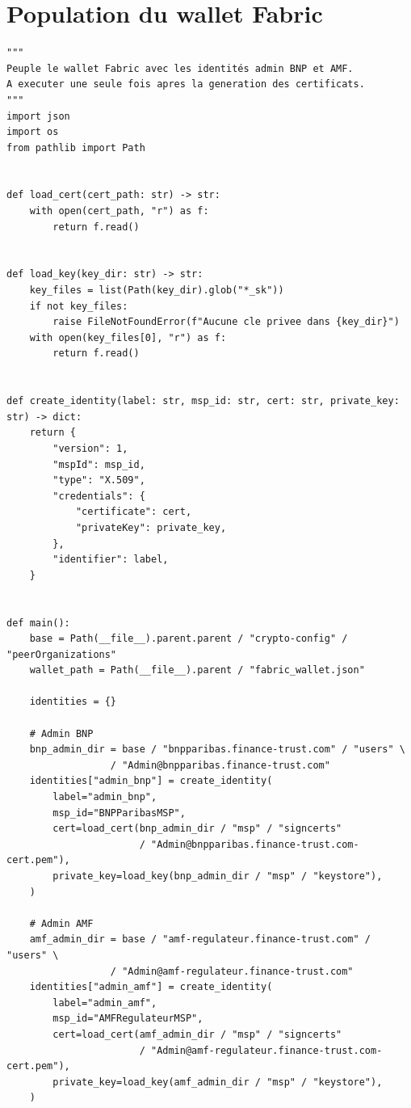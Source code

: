 \documentclass[12pt,a4paper,french]{article}
\begin{document}
\section{Population du wallet Fabric}

\begin{lstlisting}[style=python, caption={network/wallets/populate\_wallet.py}]
"""
Peuple le wallet Fabric avec les identités admin BNP et AMF.
A executer une seule fois apres la generation des certificats.
"""
import json
import os
from pathlib import Path


def load_cert(cert_path: str) -> str:
    with open(cert_path, "r") as f:
        return f.read()


def load_key(key_dir: str) -> str:
    key_files = list(Path(key_dir).glob("*_sk"))
    if not key_files:
        raise FileNotFoundError(f"Aucune cle privee dans {key_dir}")
    with open(key_files[0], "r") as f:
        return f.read()


def create_identity(label: str, msp_id: str, cert: str, private_key: str) -> dict:
    return {
        "version": 1,
        "mspId": msp_id,
        "type": "X.509",
        "credentials": {
            "certificate": cert,
            "privateKey": private_key,
        },
        "identifier": label,
    }


def main():
    base = Path(__file__).parent.parent / "crypto-config" / "peerOrganizations"
    wallet_path = Path(__file__).parent / "fabric_wallet.json"

    identities = {}

    # Admin BNP
    bnp_admin_dir = base / "bnpparibas.finance-trust.com" / "users" \
                  / "Admin@bnpparibas.finance-trust.com"
    identities["admin_bnp"] = create_identity(
        label="admin_bnp",
        msp_id="BNPParibasMSP",
        cert=load_cert(bnp_admin_dir / "msp" / "signcerts"
                       / "Admin@bnpparibas.finance-trust.com-cert.pem"),
        private_key=load_key(bnp_admin_dir / "msp" / "keystore"),
    )

    # Admin AMF
    amf_admin_dir = base / "amf-regulateur.finance-trust.com" / "users" \
                  / "Admin@amf-regulateur.finance-trust.com"
    identities["admin_amf"] = create_identity(
        label="admin_amf",
        msp_id="AMFRegulateurMSP",
        cert=load_cert(amf_admin_dir / "msp" / "signcerts"
                       / "Admin@amf-regulateur.finance-trust.com-cert.pem"),
        private_key=load_key(amf_admin_dir / "msp" / "keystore"),
    )


\end{lstlisting}
\end{document}
